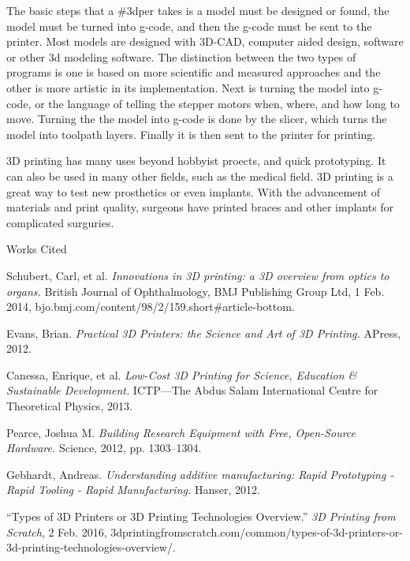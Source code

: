 \documentclass[12pt]{article}
\newcommand{\bibent}{\noindent \hangindent 40pt}
\newenvironment{workscited}{\newpage \begin{center} Works Cited \end{center}}{\newpage }
\begin{document}
\begin{flushleft}
The basic steps that a \#3dper takes is a model must be designed or found, the model must be turned into g-code, and then the g-code must be sent to the printer. Most models are designed with 3D-CAD, computer aided design, software or other 3d modeling software. The distinction between the two types of programs is one is based on more scientific and measured approaches and the other is more artistic in its implementation. Next is turning the model into g-code, or the language of telling the stepper motors when, where, and how long to move. Turning the the model into g-code is done by the slicer, which turns the model into toolpath layers. Finally it is then sent to the printer for printing.

3D printing has many uses beyond hobbyist proects, and quick prototyping. It can also be used in many other fields, such as the medical field. 3D printing is a great way to test new prosthetics or even implants. With the advancement of materials and print quality, surgeons have printed braces and other implants for complicated surguries. 

\begin{workscited}

\bibent
Schubert, Carl, et al. \textit{Innovations in 3D printing: a 3D overview from optics to organs.} British Journal of Ophthalmology, BMJ Publishing Group Ltd, 1 Feb. 2014, bjo.bmj.com/content/98/2/159.short\#article-bottom.

\bibent
Evans, Brian. \textit{Practical 3D Printers: the Science and Art of 3D Printing.} APress, 2012.

\bibent
Canessa, Enrique, et al. \textit{Low-Cost 3D Printing for Science, Education \& Sustainable Development.} ICTP—The Abdus Salam International Centre for Theoretical Physics, 2013.

\bibent
Pearce, Joshua M. \textit{Building Research Equipment with Free, Open-Source Hardware.} Science, 2012, pp. 1303–1304.

\bibent
Gebhardt, Andreas. \textit{Understanding additive manufacturing: Rapid Prototyping - Rapid Tooling - Rapid Manufacturing.} Hanser, 2012.

\bibent
``Types of 3D Printers or 3D Printing Technologies Overview.'' \textit{3D Printing from Scratch}, 2 Feb. 2016, 3dprintingfromscratch.com/common/types-of-3d-printers-or-3d-printing-technologies-overview/.

\end{workscited}

\end{flushleft}
\end{document}
